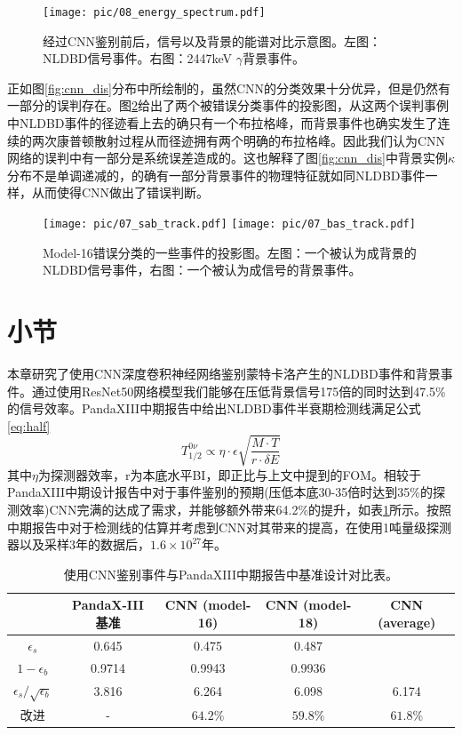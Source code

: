 \begin{figure}
    \centering
    \texttt{[image: pic/08\_energy\_spectrum.pdf]}
    \caption{经过CNN鉴别前后，信号以及背景的能谱对比示意图。左图：NLDBD信号事件。右图：2447keV $\gamma$背景事件。}
    \label{fig:cnn_specturm}
\end{figure}

正如图\ref{fig:cnn_dis}分布中所绘制的，虽然CNN的分类效果十分优异，但是仍然有一部分的误判存在。图\ref{fig:wrong_judge}给出了两个被错误分类事件的投影图，从这两个误判事例中NLDBD事件的径迹看上去的确只有一个布拉格峰，而背景事件也确实发生了连续的两次康普顿散射过程从而径迹拥有两个明确的布拉格峰。因此我们认为CNN网络的误判中有一部分是系统误差造成的。这也解释了图\ref{fig:cnn_dis}中背景实例$\kappa$分布不是单调递减的，的确有一部分背景事件的物理特征就如同NLDBD事件一样，从而使得CNN做出了错误判断。

\begin{figure}
    \centering
    \texttt{[image: pic/07\_sab\_track.pdf]}
    \texttt{[image: pic/07\_bas\_track.pdf]}
    \caption{Model-16错误分类的一些事件的投影图。左图：一个被认为成背景的NLDBD信号事件，右图：一个被认为成信号的背景事件。}
    \label{fig:wrong_judge}
\end{figure}

\section{小节}

本章研究了使用CNN深度卷积神经网络鉴别蒙特卡洛产生的NLDBD事件和背景事件。通过使用ResNet50网络模型我们能够在压低背景信号175倍的同时达到47.5\%的信号效率。PandaXIII中期报告中给出NLDBD事件半衰期检测线满足公式\ref{eq:half}\supercite{cdr}
\begin{equation}
    T_{1/2}^{0\nu}\propto\eta\cdot\epsilon\sqrt{\frac{M\cdot T}{r\cdot\delta E}}
    \label{eq:half}
\end{equation}
其中$\eta$为探测器效率，r为本底水平BI，即正比与上文中提到的FOM。相较于PandaXIII中期设计报告中对于事件鉴别的预期(压低本底30-35倍时达到35\%的探测效率)CNN完满的达成了需求，并能够额外带来64.2\%的提升，如表\ref{tab:comparison}所示。按照中期报告中对于检测线的估算并考虑到CNN对其带来的提高，在使用1吨量级探测器以及采样3年的数据后，$1.6\times10^{27}$年。

\begin{table}[hbt]
    \centering
    \begin{tabular}{ccccc}
      \\\hline
      & PandaX-III 基准 & CNN (model-16) & CNN (model-18) & CNN (average) \\\hline
      $\epsilon_{s}$ & 0.645 & 0.475  & 0.487 & \\
      $ 1-\epsilon_{b}$ & 0.9714 & 0.9943  & 0.9936 &\\
      $\epsilon_{s}/\sqrt{\epsilon_{b}}$ & 3.816 & 6.264 & 6.098 & 6.174 \\\hline
      改进 & - & $64.2\%$ & $59.8\%$ & $61.8\%$\\\hline
    \end{tabular}
    \caption{使用CNN鉴别事件与PandaXIII中期报告中基准设计对比表。}
    \label{tab:comparison}
  \end{table}
  

